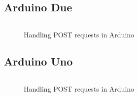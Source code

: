 \subsection{Arduino Due}

\begin{figure}[H]
\begin{lstlisting}[style=Arduino]

\end{lstlisting}
\caption{Handling POST requests in Arduino}
\label{snip:post}
\end{figure}


\subsection{Arduino Uno}

\begin{figure}[H]
\begin{lstlisting}[style=Arduino]

\end{lstlisting}
\caption{Handling POST requests in Arduino}
\label{snip:post}
\end{figure}
